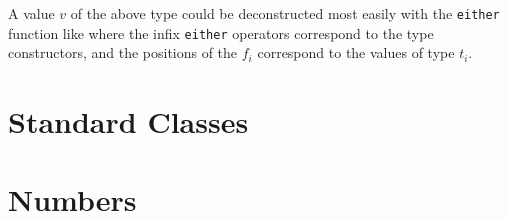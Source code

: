 A value $v$ of the above type could be deconstructed most easily with the \texttt{either} function like
where the infix \texttt{either} operators correspond to the \sym{|} type constructors, 
and the positions of the $f_i$ correspond to the values of type $t_i$.


\section{Standard \frege{} Classes} \label{std-classes} 



\section{Numbers} \label{numeric} 

